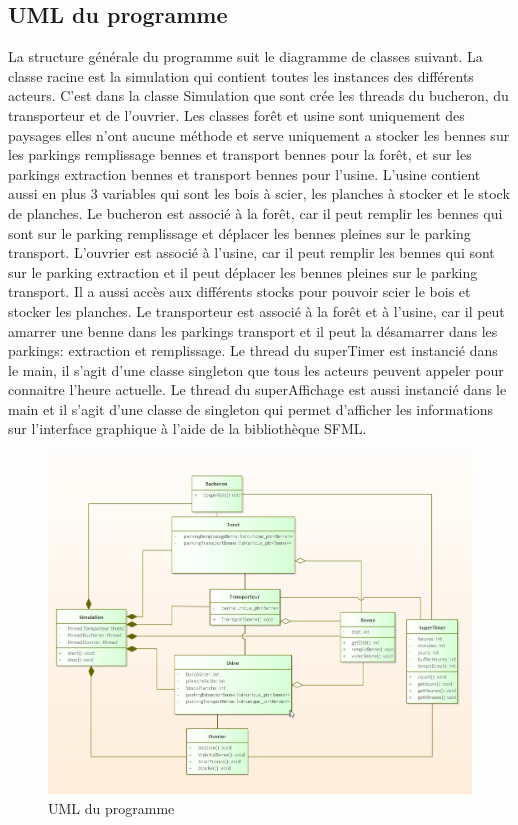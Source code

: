\documentclass[a4paper, 12pt, oneside]{article}
\begin{document}
        \subsection{UML du programme}
        La structure générale du programme suit le diagramme de classes suivant. La classe racine est la simulation qui contient toutes les instances des différents acteurs.
        C'est dans la classe Simulation que sont crée les threads du bucheron, du transporteur et de l'ouvrier. Les classes forêt et usine sont uniquement des
        paysages elles n'ont aucune méthode et serve uniquement a stocker les bennes sur les parkings remplissage bennes et transport bennes pour la forêt, et 
        sur les parkings extraction bennes et transport bennes pour l'usine. L'usine contient aussi en plus 3 variables qui sont les bois à scier,
        les planches à stocker et le stock de planches. Le bucheron est associé à la forêt, car il peut remplir les bennes qui sont sur le parking remplissage
        et déplacer les bennes pleines sur le parking transport. L'ouvrier est associé à l'usine, car il peut remplir les bennes qui sont sur le parking extraction et
        il peut déplacer les bennes pleines sur le parking transport. Il a aussi accès aux différents stocks pour pouvoir scier le bois et stocker les planches. Le
        transporteur est associé à la forêt et à l'usine, car il peut amarrer une benne dans les parkings transport et il peut la désamarrer dans les parkings: 
        extraction et remplissage.
        Le thread du superTimer est instancié dans le main, il s'agit d'une classe singleton que tous les acteurs peuvent appeler pour connaitre l'heure actuelle.
        Le thread du superAffichage est aussi instancié dans le main et il s'agit d'une classe de singleton qui permet d'afficher les informations sur 
        l'interface graphique à l'aide de la bibliothèque SFML.
        \begin{figure}[H]
            \centering
            \includegraphics[scale=0.55]{images/uml phase 1.jpg}
            \caption{UML du programme}
        \end{figure}
\end{document}
